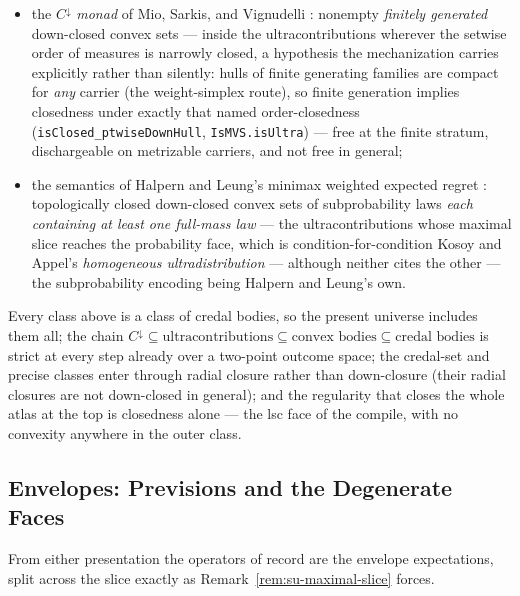 \begin{remark}
\begin{itemize}
  prevision school meeting in one theorem --- with the general
  converse Hahn--Banach-shaped, a named successor rather than a
  silent assumption;
\item the $C^{\downarrow}$ \emph{monad} of Mio, Sarkis, and
  Vignudelli \cite{mio20}: nonempty \emph{finitely generated}
  down-closed convex sets --- inside the ultracontributions
  wherever the setwise order of measures is narrowly closed, a
  hypothesis the mechanization carries explicitly rather than
  silently: hulls of finite generating families are compact for
  \emph{any} carrier (the weight-simplex route), so finite
  generation implies closedness under exactly that named
  order-closedness (\texttt{isClosed\_ptwiseDownHull},
  \texttt{IsMVS.isUltra}) --- free at the finite stratum,
  dischargeable on metrizable carriers, and not free in general;
\item the semantics of Halpern and Leung's minimax weighted
  expected regret \cite{halpern13}: topologically closed
  down-closed convex sets of subprobability laws \emph{each
  containing at least one full-mass law} --- the ultracontributions
  whose maximal slice reaches the probability face, which is
  condition-for-condition Kosoy and Appel's \emph{homogeneous
  ultradistribution} --- although neither cites the other --- the
  subprobability encoding being Halpern
  and Leung's own.
\end{itemize}
Every class above is a class of credal bodies, so the present
universe includes them all; the chain $C^{\downarrow} \subseteq
\text{ultracontributions} \subseteq \text{convex bodies} \subseteq
\text{credal bodies}$ is strict at every step already over a
two-point outcome space; the credal-set and precise classes enter
through radial closure rather than down-closure (their radial
closures are not down-closed in general); and the regularity that
closes the whole atlas at the top is closedness alone --- the lsc
face of the compile, with no convexity anywhere in the outer class.
\end{remark}

\subsection{Envelopes: Previsions and the Degenerate Faces}

From either presentation the operators of record are the envelope
expectations, split across the slice exactly as
Remark~\ref{rem:su-maximal-slice} forces.

